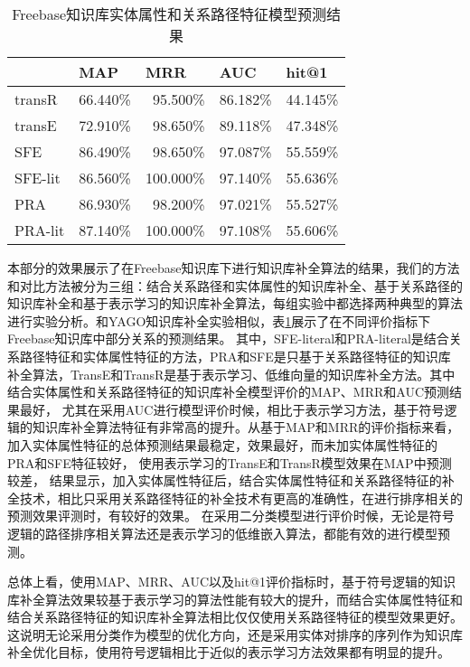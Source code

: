 \begin{table}[htbp]
  \centering
  \caption{Freebase知识库实体属性和关系路径特征模型预测结果}
    \begin{tabular}{|l|r|r|r|r|}
    \hline
          & \multicolumn{1}{l|}{MAP} & \multicolumn{1}{l|}{MRR} & \multicolumn{1}{l|}{AUC} & \multicolumn{1}{l|}{hit@1} \\
    \hline
    transR & 66.440\% & 95.500\% & 86.182\% & 44.145\% \\
    \hline
    transE & 72.910\% & 98.650\% & 89.118\% & 47.348\% \\
    \hline
    SFE   & 86.490\% & 98.650\% & 97.087\% & 55.559\% \\
    \hline
    SFE-lit & 86.560\% & 100.000\% & 97.140\% & 55.636\% \\
    \hline
    PRA   & 86.930\% & 98.200\% & 97.021\% & 55.527\% \\
    \hline
    PRA-lit & 87.140\% & 100.000\% & 97.108\% & 55.606\% \\
    \hline
    \end{tabular}%
  \label{tab:addlabel-fb}%
\end{table}%
本部分的效果展示了在Freebase知识库下进行知识库补全算法的结果，我们的方法和对比方法被分为三组：结合关系路径和实体属性的知识库补全、基于关系路径的知识库补全和基于表示学习的知识库补全算法，每组实验中都选择两种典型的算法进行实验分析。和YAGO知识库补全实验相似，表\ref{tab:addlabel-fb}展示了在不同评价指标下Freebase知识库中部分关系的预测结果。
其中，SFE-literal和PRA-literal是结合关系路径特征和实体属性特征的方法，PRA和SFE是只基于关系路径特征的知识库补全算法，TransE和TransR是基于表示学习、低维向量的知识库补全方法。其中结合实体属性和关系路径特征的知识库补全模型评价的MAP、MRR和AUC预测结果最好，
尤其在采用AUC进行模型评价时候，相比于表示学习方法，基于符号逻辑的知识库补全算法特征有非常高的提升。从基于MAP和MRR的评价指标来看，加入实体属性特征的总体预测结果最稳定，效果最好，而未加实体属性特征的PRA和SFE特征较好，
使用表示学习的TransE和TransR模型效果在MAP中预测较差，
结果显示，加入实体属性特征后，结合实体属性特征和关系路径特征的补全技术，相比只采用关系路径特征的补全技术有更高的准确性，在进行排序相关的预测效果评测时，有较好的效果。
在采用二分类模型进行评价时候，无论是符号逻辑的路径排序相关算法还是表示学习的低维嵌入算法，都能有效的进行模型预测。


总体上看，使用MAP、MRR、AUC以及hit@1评价指标时，基于符号逻辑的知识库补全算法效果较基于表示学习的算法性能有较大的提升，而结合实体属性特征和结合关系路径特征的知识库补全算法相比仅仅使用关系路径特征的模型效果更好。这说明无论采用分类作为模型的优化方向，还是采用实体对排序的序列作为知识库补全优化目标，使用符号逻辑相比于近似的表示学习方法效果都有明显的提升。


